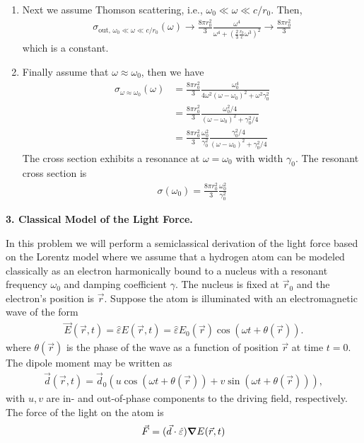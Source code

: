 \documentclass{article}
\theoremstyle{definition}
\newcommand{\f}[2]{\frac{#1}{#2}}
\newcommand{\lp}{\left(}
\newcommand{\rp}{\right)}
\begin{document}
\begin{enumerate}[label=\alph*)]
	\item Next we assume Thomson scattering, i.e., $\omega_0 \ll \omega \ll c/r_0$. Then,
	\begin{align*}
	\sigma_\text{out, $\omega_0 \ll \omega \ll c/r_0$}(\omega) \to \f{8\pi r_0^2}{3} \f{\omega^4}{\omega^4 + \lp \f{2}{3} \f{r_0}{c} \omega^3 \rp^2} \to \f{8\pi r_0^2}{3}
	\end{align*}
	which is a constant.
	
	\item Finally assume that $\omega \approx \omega_0$, then we have
	\begin{align*}
	\sigma_{\omega \approx \omega_0}(\omega) &= \f{8\pi r_0^2}{3} \f{\omega_0^4}{4\omega^2(\omega - \omega_0)^2 + \omega^2 \gamma_0^2} \\
	& = \f{8\pi r_0^2}{3}  \f{\omega_0^2/4}{ (\omega - \omega_0)^2 + \gamma_0^2/4} \\
	&= \boxed{\f{8\pi r_0^2}{3} 
	\f{\omega_0^2}{\gamma_0^2}  \f{\gamma_0^2/4}{ (\omega - \omega_0)^2 + \gamma_0^2/4}}
	\end{align*}
	The cross section exhibits a resonance at $\omega = \omega_0$ with width $\boxed{\gamma_0}$. The resonant cross section is 
	\begin{align*}
	\boxed{\sigma(\omega_0) = \f{8\pi r_0^2}{3} \f{\omega_0^2}{\gamma_0^2}}
	\end{align*}
	
	
\end{enumerate}


\noindent \textbf{3. Classical Model of the Light Force.} 


\noindent In this problem we will perform a semiclassical derivation of the light force based on the Lorentz model where we assume that a hydrogen atom can be modeled classically as an electron harmonically bound to a nucleus with a resonant frequency $\omega_0$ and damping coefficient $\gamma$. The nucleus is fixed at $\vec{r}_0$ and the electron's position is $\vec{r}$. Suppose the atom is illuminated with an electromagnetic wave of the form 
\begin{align*}
\vec{E}(\vec{r}, t) = \hat{\varepsilon}  E(\vec{r},t) = \hat{\varepsilon}  E_0(\vec{r}) \cos(\omega t + \theta(\vec{r})).
\end{align*}
where $\theta(\vec{r})$ is the phase of the wave as a function of position $\vec{r}$ at time $t=0$. The dipole moment may be written as 
\begin{align*}
\vec{d}(\vec{r},t) = \vec{d}_0 \lp u \cos(\omega t + \theta(\vec{r}))  + v\sin(\omega t + \theta(\vec{r})) \rp,
\end{align*}
with $u,v$ are in- and out-of-phase components to the driving field, respectively. The force of the light on the atom is 
\begin{align*}
\vec{F} = (\vec{d}\cdot \hat{\varepsilon}) \grad E(\vec{r},t)
\end{align*}
\end{document}
